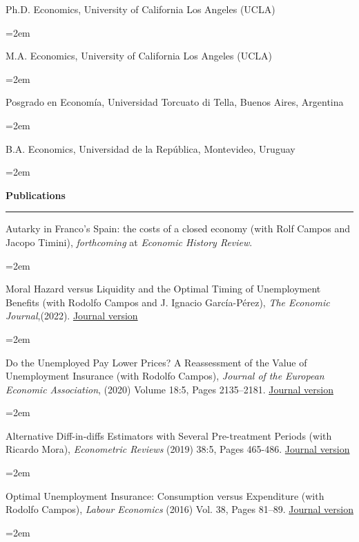 \documentclass[12pt]{article}
\newcommand{\sepspace}{\vspace*{0.5em}}		%
\newcommand{\NewPart}[1]{ \vspace*{0.4cm} \noindent \large \textbf{#1}
\par \normalsize \normalfont \vspace*{-0.5cm} \noindent\rule{\textwidth}{1.8pt} \vspace*{-0.75cm} }
\newcommand{\EducationEntry}[4]{
		\noindent #1 \hfill      %
		\noindent #2 %
		\par  %
		\noindent \textit{#3} \par        %
		\noindent\hangindent=2em\hangafter=0  #4 %
		\normalsize \par}
\begin{document}
\EducationEntry{Ph.D. Economics, University of California Los Angeles (UCLA)}{2008}{}{}

\EducationEntry{M.A. Economics, University of California Los Angeles (UCLA)}{2004}{}{}

\EducationEntry{Posgrado en Econom\'ia, Universidad Torcuato di Tella, Buenos Aires, Argentina}{2001}{}{}

\EducationEntry{B.A. Economics, Universidad de la República, Montevideo, Uruguay}{1999}{}{}

\vspace*{-0.5cm}
\NewPart{Publications}{}

\EducationEntry{Autarky in Franco’s Spain: the costs of a closed economy (with Rolf Campos and Jacopo Timini), \textit{forthcoming} at \textit{Economic History Review}.}{}{}{}

\vspace*{0.25cm}

\EducationEntry{Moral Hazard versus Liquidity and the Optimal Timing of Unemployment Benefits (with Rodolfo Campos and J. Ignacio García-Pérez), \textit{The Economic Journal},(2022).}{\href{https://academic.oup.com/ej/article-abstract/132/648/2674/6596157?redirectedFrom=fulltext&login=false}{Journal version}}{}{}

\vspace*{0.25cm}

\EducationEntry{Do the Unemployed Pay Lower Prices? A Reassessment of the Value of Unemployment Insurance (with Rodolfo Campos), \textit{Journal of the European Economic Association}, (2020) Volume 18:5, Pages 2135–2181.} {\href{https://academic.oup.com/jeea/advance-article/doi/10.1093/jeea/jvz043/5607409?guestAccessKey=14e0bd06-6410-43f0-aa64-677e87dfef66}{Journal version}}{}{}

\vspace*{-0.25cm}


\EducationEntry{Alternative Diff-in-diffs Estimators with Several Pre-treatment Periods (with Ricardo Mora), \textit{Econometric Reviews} (2019) 38:5, Pages 465-486.}{\href{http://www.tandfonline.com/doi/abs/10.1080/07474938.2017.1348683}{Journal version}}{}{}

\vspace*{-0.25cm}

\EducationEntry{Optimal Unemployment Insurance: Consumption versus Expenditure (with Rodolfo Campos), \textit{Labour Economics} (2016) Vol. 38, Pages 81–89.}{\href{https://www.sciencedirect.com/science/article/abs/pii/S0927537115001232}{Journal version}}{}{}
\end{document}

